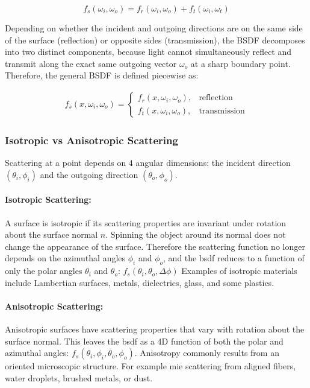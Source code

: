 \[
    f_s(\omega_i, \omega_o) = f_r(\omega_i, \omega_o) + f_t(\omega_i, \omega_t)
\]

Depending on whether the incident and outgoing directions are on the same side 
of the surface (reflection) or opposite sides (transmission), 
the BSDF decomposes into two distinct components,
because light cannot simultaneously reflect and transmit 
along the exact same outgoing vector $\omega_o$ at a sharp boundary point.
Therefore, the general BSDF is defined piecewise as:

\begin{align}
    f_s(x, \omega_i, \omega_o) = 
    \begin{cases} 
      f_r(x, \omega_i, \omega_o), & \text{reflection} \\ 
      f_t(x, \omega_i, \omega_o), & \text{transmission}
    \end{cases}
\end{align}

\subsubsection{Isotropic vs Anisotropic Scattering}\label{subsubsec:isotropic-anisotropic-scattering}

Scattering at a point depends on 4 angular dimensions: 
the incident direction $(\theta_i, \phi_i)$ and the outgoing direction $(\theta_o, \phi_o)$.
~\cite{Pharr2016PBR,10.1145/133994.134078}

\paragraph{Isotropic Scattering:}

A surface is isotropic if its scattering properties are invariant under rotation about the surface normal $n$.
Spinning the object around its normal does not change the appearance of the surface.
Therefore the scattering function no longer depends on the azimuthal angles $\phi_i$ and $\phi_o$,
and the \gls{bsdf} reduces to a function of only the polar angles $\theta_i$ and $\theta_o$: 
$f_s(\theta_i, \theta_o, \Delta\phi)$
Examples of isotropic materials include Lambertian surfaces, metals, dielectrics, glass, and some plastics.

\paragraph{Anisotropic Scattering:}

Anisotropic surfaces have scattering properties that vary with rotation about the surface normal.
This leaves the \gls{bsdf} as a 4D function of both the polar and azimuthal angles:
$f_s(\theta_i,\phi_i,\theta_o,\phi_o)$.
Anisotropy commonly results from an oriented microscopic structure.
For example mie scattering from aligned fibers, water droplets, brushed metals, or dust.

